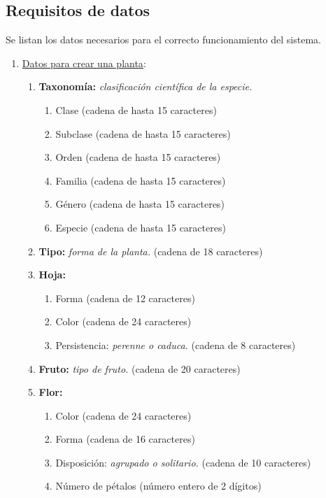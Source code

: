 \documentclass[10pt,a4paper]{article}
\begin{document}
\subsection{\textbf{Requisitos de datos}}

Se listan los datos necesarios para el correcto funcionamiento del sistema.
\newline
\begin{enumerate}[label={RD\arabic*.} ,leftmargin=2.8\parindent]
 
 	\item \underline{Datos para crear una planta}:
	\begin{enumerate}[label={RD1.\arabic*.}]
	
	\item 
		\textbf{Taxonomía:} \textit{clasificación científica de la especie.}
	\begin{enumerate}[label=-]
		\item Clase (cadena de hasta 15 caracteres)
		\item Subclase (cadena de hasta 15 caracteres)
		\item Orden (cadena de hasta 15 caracteres)
		\item Familia (cadena de hasta 15 caracteres)
		\item Género (cadena de hasta 15 caracteres)
		\item Especie (cadena de hasta 15 caracteres)
	\end{enumerate}
	\medskip
	
	\item 
		\textbf{Tipo:} \textit{forma de la planta.} (cadena de 18 caracteres)

	\medskip
	\item
		\textbf{Hoja:}
	\begin{enumerate}[label=-]
		\item Forma (cadena de 12 caracteres)
		\item Color (cadena de 24 caracteres)
		\item Persistencia: \textit{perenne o caduca.} (cadena de 8 caracteres)
	\end{enumerate}

	\medskip	
	\item
		\textbf{Fruto:} \textit{tipo de fruto.} (cadena de 20 caracteres)

	\medskip
	\item
		\textbf{Flor:}
	\begin{enumerate} [label=-]
		\item Color (cadena de 24 caracteres)
		\item Forma (cadena de 16 caracteres)
		\item Disposición: \textit{agrupado o solitario.} (cadena de 10 caracteres)
		\item Número de pétalos (número entero de 2 dígitos)
	\end{enumerate}
	

\end{enumerate}
\end{enumerate}
\end{document}
